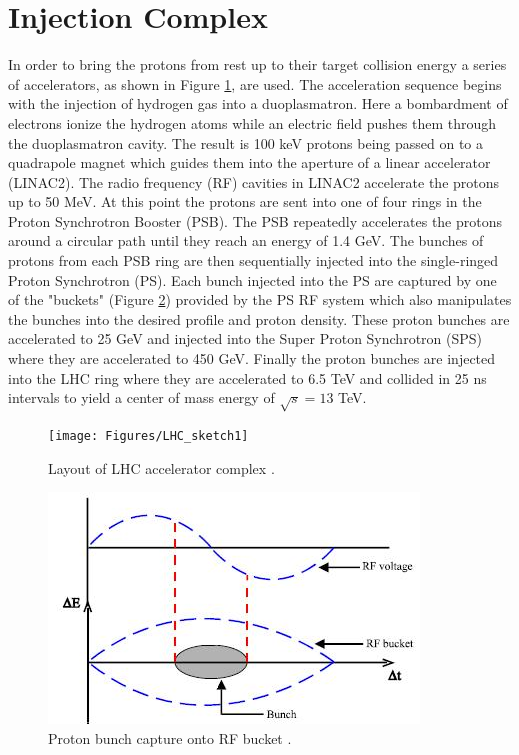 \section{Injection Complex}
In order to bring the protons from rest up to their target collision energy a series of accelerators, as shown in Figure \ref{fig:lhcsketch}, are used.  The acceleration sequence begins with the injection of hydrogen gas into a duoplasmatron.  Here a bombardment of electrons ionize the hydrogen atoms while an electric field pushes them through the duoplasmatron cavity. The result is 100 keV protons being passed on to a quadrapole magnet which guides them into the aperture of a linear accelerator (LINAC2).  The radio frequency (RF) cavities in LINAC2 accelerate the protons up to 50 MeV.  At this point the protons are sent into one of four rings in the Proton Synchrotron Booster (PSB).  The PSB repeatedly accelerates the protons around a circular path until they reach an energy of 1.4 GeV.  The bunches of protons from each PSB ring are then sequentially injected into the single-ringed Proton Synchrotron (PS).  Each bunch injected into the PS are captured by one of the "buckets" (Figure \ref{fig:rfbucket}) provided by the PS RF system which also manipulates the bunches into the desired profile and proton density. These proton bunches are accelerated to 25 GeV and injected into the Super Proton Synchrotron (SPS) where they are accelerated to 450 GeV.  Finally the proton bunches are injected into the LHC ring where they are accelerated to 6.5 TeV and collided in 25 ns intervals to yield a center of mass energy of $\sqrt{s} = 13$ TeV.

\begin{figure}[h]
	\centering
	\texttt{[image: Figures/LHC\_sketch1]}
	\caption{Layout of LHC accelerator complex \cite{Evans_2008}.}
	\label{fig:lhcsketch}
\end{figure}

\begin{figure}[h]
	\centering
	\includegraphics[width=0.7\linewidth]{Figures/RFbucket}
	\caption{Proton bunch capture onto RF bucket \cite{Baird:1017689}.}
	\label{fig:rfbucket}
\end{figure}


